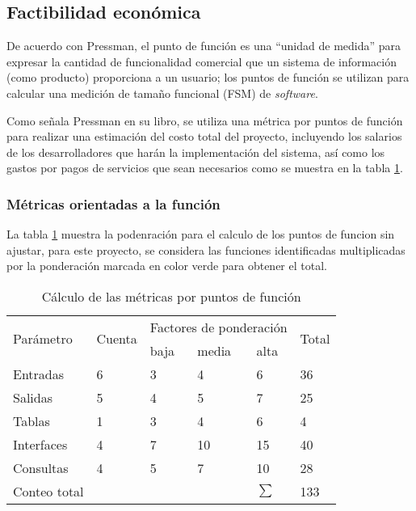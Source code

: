 \subsection{Factibilidad económica}

De acuerdo con Pressman\cite{pressman_software_2005}, el punto de función es una ``unidad de medida'' para expresar la cantidad de funcionalidad comercial que un sistema de información (como producto) proporciona a un usuario; los puntos de función se utilizan para calcular una medición de tamaño funcional (FSM) de \textit{software}.

Como señala Pressman en su libro, se utiliza una métrica por puntos de función para realizar una estimación del costo total del proyecto, incluyendo los salarios de los desarrolladores que harán la implementación del sistema, así como los gastos por pagos de servicios que sean necesarios como se muestra en la tabla \ref{tab:function_point_metrics}.

\subsubsection*{Métricas orientadas a la función}


La tabla \ref{tab:function_point_metrics} muestra la podenración para el calculo de los puntos de funcion sin ajustar,  para este proyecto, se considera las funciones identificadas multiplicadas por la ponderación marcada en color verde para obtener el total.


\begin{table}[H]
	\centering
	\begin{tabular}{|l|l|l|l|l|l|}
	\hline
	\multirow{2}{*}{Parámetro} & \multirow{2}{*}{Cuenta} & \multicolumn{3}{|l|}{Factores de ponderación} & \multirow{2}{*}{Total} \\ \cline{3-5}
														 &                         & baja       	& media       & alta		       &                        \\ \hline
	Entradas                   & 6                       & 3            & 4           & \cellcolor[HTML]{66BB6A} 6              & 36 \\ \hline
	Salidas                     & 5                       & 4            & \cellcolor[HTML]{66BB6A} 5           & 7              & 25 \\ \hline
	Tablas                     & 1                       & 3            &\cellcolor[HTML]{66BB6A} 4           & 6              & 4 \\ \hline
	Interfaces                 & 4                       & 7            &\cellcolor[HTML]{66BB6A} 10          & 15             & 40 \\ \hline
	Consultas                  & 4                       & 5            &\cellcolor[HTML]{66BB6A} 7           & 10             & 28 \\ \hline
	Conteo total               &                         &              &             &		    $ \sum $         &\cellcolor[HTML]{66BB6A} 133 \\ \hline
	\end{tabular}
	\caption{Cálculo de las métricas por puntos de función}
	\label{tab:function_point_metrics}
	\end{table}


